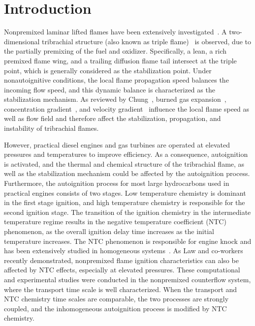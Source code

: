 \documentclass{wssci}
\begin{document}

\section{Introduction}

Nonpremixed laminar lifted flames have been extensively investigated~\cite{chung07}.  A two-dimensional tribrachial structure (also known as triple flame)~\cite{buckmaster02} is observed, due to the partially premixing of the fuel and oxidizer.  Specifically, a lean, a rich premixed flame wing, and a trailing diffusion flame tail intersect at the triple point, which is generally considered as the stabilization point.  Under nonautoignitive conditions, the local flame propagation speed balances the incoming flow speed, and this dynamic balance is characterized as the stabilization mechanism.  As reviewed by Chung~\cite{chung07}, burned gas expansion~\cite{ruetsch95,lee97,plessing98,kioni99}, concentration gradient~\cite{dold89,hartley91,ghosal00}, and velocity gradient~\cite{kim07} influence the local flame speed as well as flow field and therefore affect the stabilization, propagation, and instability of tribrachial flames.

However, practical diesel engines and gas turbines are operated at elevated pressures and temperatures to improve efficiency.  As a consequence, autoignition is activated, and the thermal and chemical structure of the tribrachial flame, as well as the stabilization mechanism could be affected by the autoignition process.  Furthermore, the autoignition process for most large hydrocarbons used in practical engines consists of two stages.  Low temperature chemistry is dominant in the first stage ignition, and high temperature chemistry is responsible for the second ignition stage.  The transition of the ignition chemistry in the intermediate temperature regime results in the negative temperature coefficient (NTC) phenomenon, as the overall ignition delay time increases as the initial temperature increases.  The NTC phenomenon is responsible for engine knock and has been extensively studied in homogeneous systems~\cite{zador11}.  As Law and co-workers~\cite{law12,zhao13,deng14} recently demonstrated, nonpremixed flame ignition characteristics can also be affected by NTC effects, especially at elevated pressures.  These computational and experimental studies were conducted in the nonpremixed counterflow system, where the transport time scale is well characterized.  When the transport and NTC chemistry time scales are comparable, the two processes are strongly coupled, and the inhomogeneous autoignition process is modified by NTC chemistry.
\end{document}
